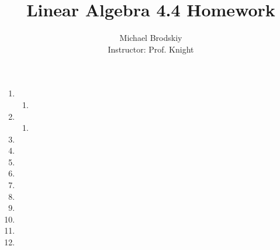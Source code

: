 \documentclass[12pt]{article}
\title{Linear Algebra 4.4 Homework}
\date{}
\author{Michael Brodskiy\\ \small Instructor: Prof. Knight}
\begin{document}
\maketitle

\begin{enumerate}

  \item

    \begin{enumerate}

      \item 

    \end{enumerate}

    \setcounter{enumi}{2}

  \item

    \begin{enumerate}

      \item 

    \end{enumerate}

    \setcounter{enumi}{4}

  \item

    \setcounter{enumi}{6}

  \item

    \setcounter{enumi}{8}

  \item

    \setcounter{enumi}{12}

  \item

    \setcounter{enumi}{14}

  \item

    \setcounter{enumi}{18}

  \item

    \setcounter{enumi}{20}

  \item

    \setcounter{enumi}{24}

  \item

  \item

    \setcounter{enumi}{30}

  \item


\end{enumerate}
\end{document}
